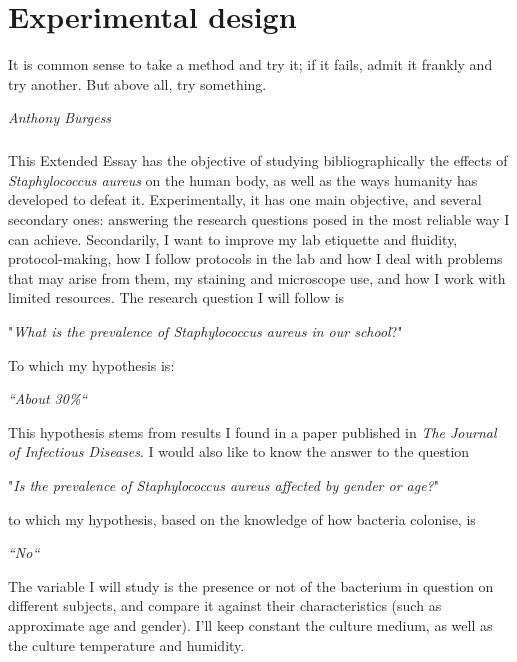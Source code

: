 \chapter{Experimental design}
\epigraph{It is common sense to take a method and try it; if it fails, admit it frankly and try another. But above all, try something.}{\textit{Anthony Burgess}}
\paragraph{}This Extended Essay has the objective of studying bibliographically the effects of \emph{Staphylococcus aureus} on the human body, as well as the ways humanity has developed to defeat it. Experimentally, it has one main objective, and several secondary ones: answering the research questions posed in the most reliable way I can achieve. Secondarily, I want to improve my lab etiquette and fluidity, protocol-making, how I follow protocols in the lab and how I deal with problems that may arise from them, my staining and microscope use,  and how I work with limited resources.\newline 
The research question I will follow is 
\begin{center}"\emph{What is the prevalence of \emph{Staphylococcus aureus} in our school}?"\end{center}
To which my hypothesis is:
\begin{center}\emph{``About 30\%``}\end{center} 
This hypothesis stems from results I found in a paper published in \emph{The Journal of Infectious Diseases}\cite{kuehnertPrevalenceStaphylococcusAureus2006}. I would also like to know the answer to the question
\begin{center}"\emph{Is the prevalence of \emph{Staphylococcus aureus} affected by gender or age?}"\end{center}
to which my hypothesis, based on the knowledge of how bacteria colonise, is 
\begin{center}\emph{``No``}\end{center}
The variable I will study is the presence or not of the bacterium in question on different subjects, and compare it against their characteristics (such as approximate age and gender). I'll keep constant the culture medium, as well as the culture temperature and humidity.
